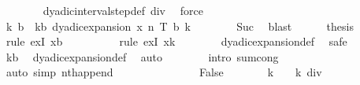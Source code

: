 \begin{isabellebody}
\ \ \ \ \ \ \isamarkupfalse%
\ dyadic{\isacharunderscore}{\kern0pt}interval{\isacharunderscore}{\kern0pt}step{\isacharunderscore}{\kern0pt}def\ div{}\ \isamarkupfalse%
\ force\isanewline
\ \ \ \ \isamarkupfalse%
\ \isamarkupfalse%
\ k{\isacharprime}{\kern0pt}\ b\ \ kb{\isacharcolon}{\kern0pt}\ {\isachardoublequoteopen}dyadic{\isacharunderscore}{\kern0pt}expansion\ x\ n\ T\ b\ k{\isacharprime}{\kern0pt}{\isachardoublequoteclose}\isanewline
\ \ \ \ \ \ \isamarkupfalse%
\ Suc{\isacharparenleft}{\kern0pt}{}{\isacharparenright}{\kern0pt}\ \isamarkupfalse%
\ blast\isanewline
\ \ \ \ \isamarkupfalse%
\ {\isacharquery}{\kern0pt}thesis\isanewline
\ \ \ \ \ \ \isamarkupfalse%
\ {\isacharparenleft}{\kern0pt}rule\ exI{\isacharbrackleft}{\kern0pt}\ x{\isacharequal}{\kern0pt}{\isachardoublequoteopen}b\ {\isacharat}{\kern0pt}\ {\isacharbrackleft}{\kern0pt}{}{\isacharbrackright}{\kern0pt}{\isachardoublequoteclose}{\isacharbrackright}{\kern0pt}{\isacharparenright}{\kern0pt}\isanewline
\ \ \ \ \ \ \isamarkupfalse%
\ {\isacharparenleft}{\kern0pt}rule\ exI{\isacharbrackleft}{\kern0pt}\ x{\isacharequal}{\kern0pt}{\isachardoublequoteopen}k{\isacharprime}{\kern0pt}{\isachardoublequoteclose}{\isacharbrackright}{\kern0pt}{\isacharparenright}{\kern0pt}\isanewline
\ \ \ \ \ \ \isamarkupfalse%
\ dyadic{\isacharunderscore}{\kern0pt}expansion{\isacharunderscore}{\kern0pt}def\ \isamarkupfalse%
\ safe\isanewline
\ \ \ \ \ \ \isamarkupfalse%
\ kb\ \isamarkupfalse%
\ dyadic{\isacharunderscore}{\kern0pt}expansion{\isacharunderscore}{\kern0pt}def\ \isamarkupfalse%
\ auto\isanewline
\ \ \ \ \ \ \isamarkupfalse%
\ {\isacharparenleft}{\kern0pt}intro\ sum{\isachardot}{\kern0pt}cong{\isacharparenright}{\kern0pt}\isanewline
\ \ \ \ \ \ \isamarkupfalse%
\ {\isacharparenleft}{\kern0pt}auto\ simp{\isacharcolon}{\kern0pt}\ nth{\isacharunderscore}{\kern0pt}append{\isacharparenright}{\kern0pt}\isanewline
\ \ \ \ \ \ \isamarkupfalse%
\isanewline
\ \ \isamarkupfalse%
\isanewline
\ \ \ \ \isamarkupfalse%
\ False\isanewline
\ \ \ \ \isamarkupfalse%
\ \isamarkupfalse%
\ {\isachardoublequoteopen}k\ {\isacharequal}{\kern0pt}\ {}\ {\isacharasterisk}{\kern0pt}\ {\isacharparenleft}{\kern0pt}k\ div\ {}{\isacharparenright}{\kern0pt}\ {\isacharplus}{\kern0pt}\ {}{\isachardoublequoteclose}\isanewline

\end{isabellebody}
